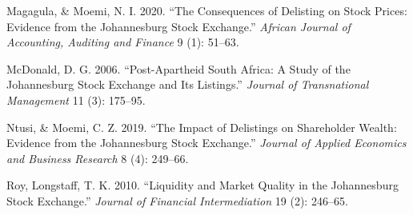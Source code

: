 \documentclass[
]{article}
\newlength{\cslhangindent}
\newlength{\cslentryspacingunit} %
\newenvironment{CSLReferences}[2] %
 {%
  \setlength{\parindent}{0pt}
  \ifodd #1
  \let\oldpar\par
  \def\par{\hangindent=\cslhangindent\oldpar}
  \fi
  \setlength{\parskip}{#2\cslentryspacingunit}
 }%
 {}
\begin{document}
\begin{CSLReferences}{1}{0}
\leavevmode{}%
Magagula, \& Moemi, N. I. 2020. {``The Consequences of Delisting on
Stock Prices: Evidence from the Johannesburg Stock Exchange.''}
\emph{African Journal of Accounting, Auditing and Finance} 9 (1):
51--63.

\leavevmode{}%
McDonald, D. G. 2006. {``Post-Apartheid South Africa: A Study of the
Johannesburg Stock Exchange and Its Listings.''} \emph{Journal of
Transnational Management} 11 (3): 175--95.

\leavevmode{}%
Ntusi, \& Moemi, C. Z. 2019. {``The Impact of Delistings on Shareholder
Wealth: Evidence from the Johannesburg Stock Exchange.''} \emph{Journal
of Applied Economics and Business Research} 8 (4): 249--66.

\leavevmode{}%
Roy, Longstaff, T. K. 2010. {``Liquidity and Market Quality in the
Johannesburg Stock Exchange.''} \emph{Journal of Financial
Intermediation} 19 (2): 246--65.

\end{CSLReferences}
\end{document}
